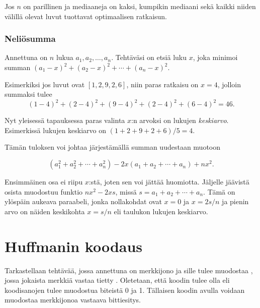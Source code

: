 Jos $n$ on parillinen ja mediaaneja on kaksi,
kumpikin mediaani sekä kaikki niiden välillä
olevat luvut tuottavat optimaalisen ratkaisun.

\subsubsection{Neliösumma}

\begin{task}
Annettuna on $n$ lukua $a_1,a_2,\ldots,a_n$.
Tehtäväsi on etsiä luku $x$, joka minimoi summan
$(a_1-x)^2+(a_2-x)^2+\cdots+(a_n-x)^2.$
\end{task}

Esimerkiksi jos luvut ovat $[1,2,9,2,6]$,
niin paras ratkaisu on $x=4$,
jolloin summaksi tulee
\[
(1-4)^2+(2-4)^2+(9-4)^2+(2-4)^2+(6-4)^2=46.
\]

\noindent
Nyt yleisessä tapauksessa
paras valinta $x$:n arvoksi on lukujen
\textit{keskiarvo}.
Esimerkissä lukujen keskiarvo on $(1+2+9+2+6)/5=4$.

Tämän tuloksen voi johtaa järjestämällä summan
uudestaan muotoon

\[
(a_1^2+a_2^2+\cdots+a_n^2)-2x(a_1+a_2+\cdots+a_n)+nx^2.
\]

Ensimmäinen osa ei riipu $x$:stä, joten sen voi jättää huomiotta.
Jäljelle jäävistä osista muodostuu funktio
$nx^2-2xs$, missä $s=a_1+a_2+\cdots+a_n$.
Tämä on ylöspäin aukeava paraabeli,
jonka nollakohdat ovat $x=0$ ja $x=2s/n$
ja pienin arvo on näiden keskikohta
$x=s/n$ eli taulukon lukujen keskiarvo.

\section{Huffmanin koodaus}


Tarkastellaan tehtävää, jossa annettuna on merkkijono ja
sille tulee muodostaa ,
jossa jokaista merkkiä vastaa tietty .
Oletetaan, että koodin tulee olla 
eli koodisanojen tulee muodostua biteistä 0 ja 1.
Tällaisen koodin avulla voidaan muodostaa merkkijonoa
vastaava bittiesitys.

